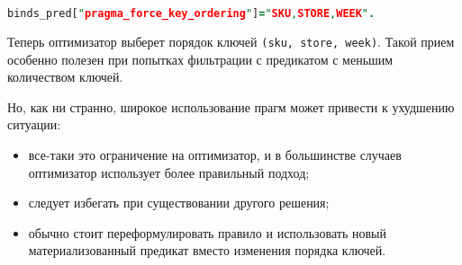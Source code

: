 \begin{lstlisting}[language=Prolog]
binds_pred["pragma_force_key_ordering"]="SKU,STORE,WEEK".
\end{lstlisting}

Теперь оптимизатор выберет порядок ключей \lstinline{(sku, store, week)}. Такой прием особенно полезен при попытках фильтрации с предикатом с меньшим количеством ключей.

Но, как ни странно, широкое использование прагм может привести к ухудшению ситуации:

\begin{itemize}
  \item все-таки это ограничение на оптимизатор, и в большинстве случаев оптимизатор использует более правильный подход;
  \item следует избегать при существовании другого решения;
  \item обычно стоит переформулировать правило и использовать новый материализованный предикат вместо изменения порядка ключей.
\end{itemize}
